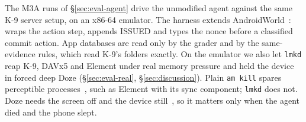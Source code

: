  The M3A runs of \S\ref{sec:eval-agent} drive the unmodified agent against the same K-9 server setup, on an x86-64 emulator. The harness extends AndroidWorld~\cite{rawles2025androidworld}: \sys wraps the action step, appends \textsf{ISSUED} and types the nonce before a
classified commit action. App databases are read only by the grader and by the same-evidence rules, which read K-9's folders exactly.
On the emulator we also let \texttt{lmkd} reap K-9, DAVx5 and Element under real memory pressure and held the device in forced deep Doze (\S\ref{sec:eval-real}, \S\ref{sec:discussion}). Plain \texttt{am kill} spares perceptible
processes~\cite{android_adb}, such as Element with its sync component; \texttt{lmkd} does not. Doze needs the screen off and the device still~\cite{android_doze}, so it matters only when the agent died and the phone slept.
